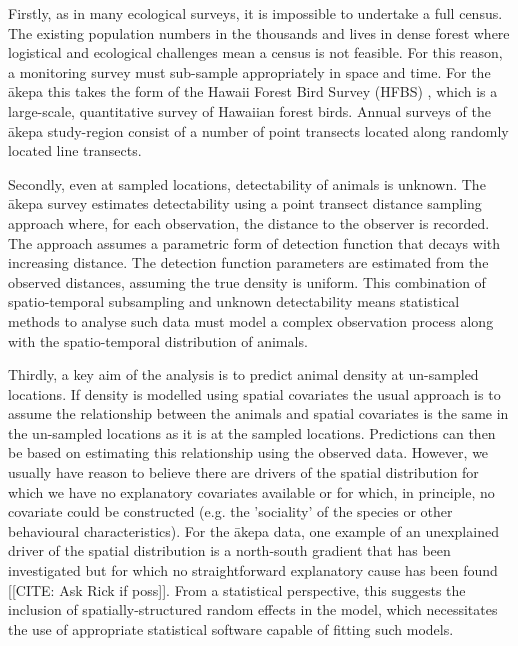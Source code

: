 \documentclass[preprint,12pt]{elsarticle}
\newcommand{\akepa}{\textquotesingle\={a}kepa}  %
\begin{document}
Firstly, as in many ecological surveys, it is impossible to undertake a full census.  The existing population numbers in the thousands and lives in dense forest where logistical and ecological challenges mean a census is not feasible.  For this reason, a monitoring survey must sub-sample appropriately in space and time.  For the \akepa{} this takes the form of the Hawaii Forest Bird Survey (HFBS) \citep{scott_HFBS_1986}, which is a large-scale, quantitative survey of Hawaiian forest birds.  Annual surveys of the \akepa{} study-region consist of a number of point transects located along randomly located line transects.    

Secondly, even at sampled locations, detectability of animals is unknown.  The \akepa{} survey estimates detectability using a point transect distance sampling approach \citep{buckland_distance_2015} where, for each observation, the distance to the observer is recorded.  The approach assumes a parametric form of detection function that decays with increasing distance.  The detection function parameters are estimated from the observed distances, assuming the true density is uniform. This combination of spatio-temporal subsampling and unknown detectability means statistical methods to analyse such data must model a complex observation process along with the spatio-temporal distribution of animals.  

Thirdly, a key aim of the analysis is to predict animal density at un-sampled locations.  If density is modelled using spatial covariates the usual approach is to assume the relationship between the animals and spatial covariates is the same in the un-sampled locations as it is at the sampled locations.  Predictions can then be based on estimating this relationship using the observed data.  However, we usually have reason to believe there are drivers of the spatial distribution for which we have no explanatory covariates available or for which, in principle, no covariate could be constructed (e.g. the 'sociality' of the species or other behavioural characteristics).  For the \akepa{} data, one example of an unexplained driver of the spatial distribution is a north-south gradient that has been investigated but for which no straightforward explanatory cause has been found [[CITE: Ask Rick if poss]].  From a statistical perspective, this suggests the inclusion of spatially-structured random effects in the model, which necessitates the use of appropriate statistical software capable of fitting such models.
\end{document}
